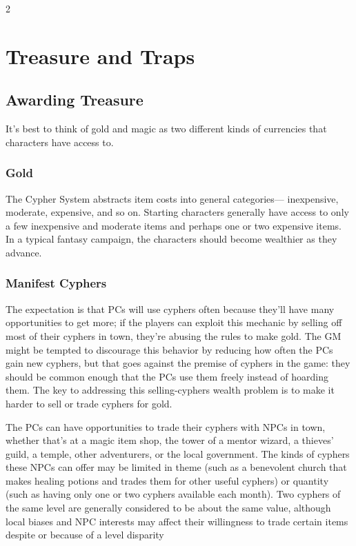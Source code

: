 \begin{multicols}{2}

\chapter{Treasure and Traps}

\section{Awarding Treasure}

It’s best to think of gold and magic as two different kinds of currencies that characters have access to. 

\subsection{Gold}

The Cypher System abstracts item costs into general categories— inexpensive, moderate, expensive, and so on. Starting characters generally have access to only a few inexpensive and moderate items and perhaps one or two expensive items. In a typical fantasy campaign, the characters should become wealthier as they advance. 

\subsection{Manifest Cyphers}

The expectation is that PCs will use cyphers often because they’ll have many opportunities to get more; if the players can exploit this mechanic by selling off most of their cyphers in town, they’re abusing the rules to make gold. The GM might be tempted to discourage this behavior by reducing how often the PCs gain new cyphers, but that goes against the premise of cyphers in the game: they should be common enough that the PCs use them freely instead of hoarding them. The key to addressing this selling-cyphers wealth problem is to make it harder to sell or trade cyphers for gold.
	
The PCs can have opportunities to trade their cyphers with NPCs in town, whether that’s at a magic item shop, the tower of a mentor wizard, a thieves’ guild, a temple, other adventurers, or the local government. The kinds of cyphers these NPCs can offer may be limited in theme (such as a benevolent church that makes healing potions and trades them for other useful cyphers) or quantity (such as having only one or two cyphers available each month). Two cyphers of the same level are generally considered to be about the same value, although local biases and NPC interests may affect their willingness to trade certain items despite or because of a level disparity


\end{multicols}
